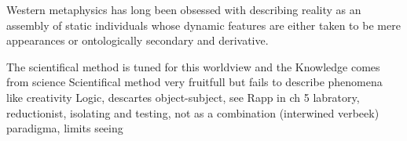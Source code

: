 

















Western metaphysics has long been obsessed with describing reality as an assembly of static individuals whose dynamic features are either taken to be mere appearances or ontologically secondary and derivative. 

The scientifical method is tuned for this worldview and the 
Knowledge comes from science
Scientifical method very fruitfull but fails to describe phenomena like creativity
Logic, descartes object-subject, see Rapp in ch 5
\cite[ch 5]{rapp1990whitehead}
labratory, reductionist, isolating and testing, not as a combination (interwined verbeek)
paradigma, limits seeing
\cite[ch 5]{rapp1990whitehead}


